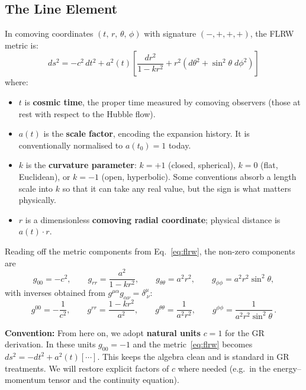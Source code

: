\subsection{The Line Element}

In comoving coordinates $(t,\, r,\, \theta,\, \phi)$ with signature $(-,+,+,+)$, the FLRW metric is:
\begin{equation}
    \boxed{\;
    ds^{2} = -c^{2}\,dt^{2}
    + a^{2}(t)\!\left[\frac{dr^{2}}{1-kr^{2}}
    + r^{2}\!\left(d\theta^{2} + \sin^{2}\!\theta\;d\phi^{2}\right)\right]
    \;}
    \label{eq:flrw}
\end{equation}
where:
\begin{itemize}
    \item $t$ is \textbf{cosmic time}, the proper time measured by comoving observers (those at rest with respect to the Hubble flow).
    \item $a(t)$ is the \textbf{scale factor}, encoding the expansion history. It is conventionally normalised to $a(t_{0})=1$ today.
    \item $k$ is the \textbf{curvature parameter}: $k=+1$ (closed, spherical), $k=0$ (flat, Euclidean), or $k=-1$ (open, hyperbolic). Some conventions absorb a length scale into $k$ so that it can take any real value, but the sign is what matters physically.
    \item $r$ is a dimensionless \textbf{comoving radial coordinate}; physical distance is $a(t)\cdot r$.
\end{itemize}

Reading off the metric components from Eq.~\eqref{eq:flrw}, the non-zero components are
\begin{equation}
    g_{00} = -c^2,\qquad g_{rr} = \frac{a^2}{1-kr^2},\qquad g_{\theta\theta} = a^2 r^2,\qquad g_{\phi\phi} = a^2 r^2\sin^2\!\theta,
\end{equation}
with inverses obtained from $g^{\mu\alpha}g_{\alpha\nu}=\delta^\mu_{\ \nu}$:
\begin{equation}
    g^{00} = -\frac{1}{c^2},\qquad g^{rr} = \frac{1-kr^2}{a^2},\qquad g^{\theta\theta} = \frac{1}{a^2 r^2},\qquad g^{\phi\phi} = \frac{1}{a^2 r^2\sin^2\!\theta}\,.
\end{equation}

\medskip
\noindent\textbf{Convention:} From here on, we adopt \textbf{natural units} $c=1$ for the GR derivation. In these units $g_{00}=-1$ and the metric~\eqref{eq:flrw} becomes $ds^2=-dt^2+a^2(t)[\cdots]$. This keeps the algebra clean and is standard in GR treatments. We will restore explicit factors of $c$ where needed (e.g.\ in the energy--momentum tensor and the continuity equation).

